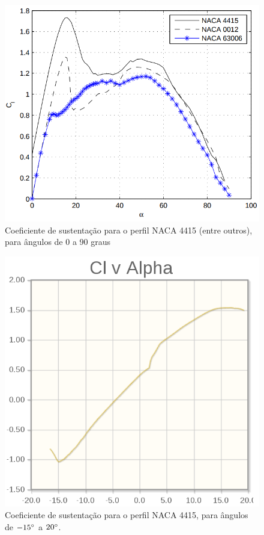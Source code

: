 \documentclass{article}
\begin{document}
	\begin{figure}[ht]
		\centering
		\includegraphics[scale=0.3]{coef-lift-angulos-altos.png}
		\caption{Coeficiente de sustentação para o perfil NACA 4415 (entre outros), para ângulos de 0 a 90 graus}
		\label{fig:coef-lift-angulos-altos}
	\end{figure}

	\begin{figure}[ht]
		\centering
		\includegraphics[scale=0.3]{coef-lift-angulos-baixos.png}
		\caption{Coeficiente de sustentação para o perfil NACA 4415, para ângulos de $-15\degree$ a $20\degree$.}
		\label{fig:coef-lift-angulos-baixos}
	\end{figure}
\end{document}
